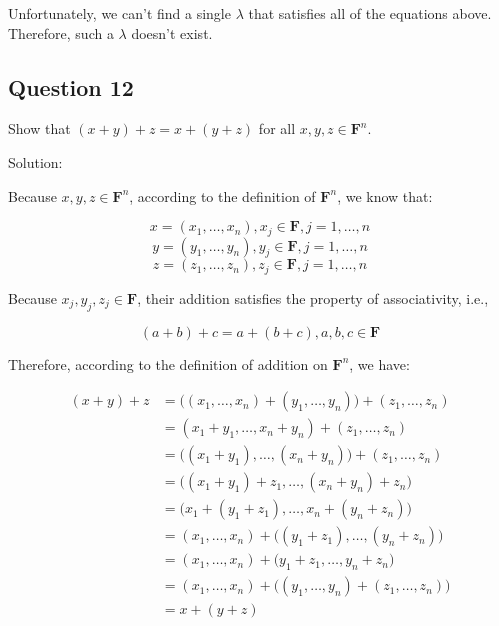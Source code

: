 \documentclass[12pt, letterpaper, oneside]{book}
\begin{document}
Unfortunately, we can't find a single $\lambda$ that satisfies all of the
equations above. Therefore, such a $\lambda$ doesn't exist.

\subsection{Question 12}

Show that $(x + y) + z = x + (y + z)$ for all $x, y, z \in \mathbf{F}^n$.

Solution:

Because $x, y, z \in \mathbf{F}^n$, according to the definition of
$\mathbf{F}^n$, we know that:

\[ x = (x_1, \ldots, x_n), x_j \in \mathbf{F}, j = 1, \ldots, n \]
\[ y = (y_1, \ldots, y_n), y_j \in \mathbf{F}, j = 1, \ldots, n \]
\[ z = (z_1, \ldots, z_n), z_j \in \mathbf{F}, j = 1, \ldots, n \]

Because $x_j, y_j, z_j \in \mathbf{F}$, their addition satisfies the property
of associativity, i.e.,

\[ (a + b) + c = a + (b + c), a, b, c \in \mathbf{F} \]

Therefore, according to the definition of addition on $\mathbf{F}^n$, we have:

\begin{equation*}
  \begin{split}
    (x + y) + z
    & = \bigl((x_1, \ldots, x_n) + (y_1, \ldots, y_n)\bigr) +
      (z_1, \ldots, z_n) \\
    & = (x_1 + y_1, \ldots, x_n + y_n) + (z_1, \ldots, z_n) \\
    & = \bigl((x_1 + y_1), \ldots, (x_n + y_n)\bigr) + (z_1, \ldots, z_n) \\
    & = \bigl((x_1 + y_1) + z_1, \ldots, (x_n + y_n) + z_n\bigr) \\
    & = \bigl(x_1 + (y_1 + z_1), \ldots, x_n + (y_n + z_n)\bigr) \\
    & = (x_1, \ldots, x_n) + \bigl((y_1 + z_1), \ldots, (y_n + z_n)\bigr) \\
    & = (x_1, \ldots, x_n) + \bigl(y_1 + z_1, \ldots, y_n + z_n\bigr) \\
    & = (x_1, \ldots, x_n) + \bigl((y_1, \ldots, y_n) +
      (z_1, \ldots, z_n)\bigr) \\
    & = x + (y + z)
  \end{split}
\end{equation*}
\end{document}

